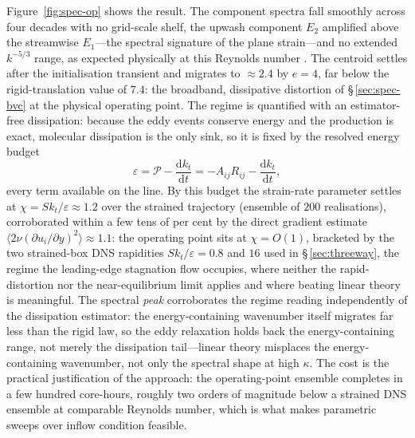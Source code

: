 \documentclass[11pt,a4paper]{article}
\begin{document}
Figure~\ref{fig:spec-op} shows the result. The component spectra fall
smoothly across four decades with no grid-scale shelf, the upwash
component $E_2$ amplified above the streamwise $E_1$---the spectral
signature of the plane strain---and no extended $k^{-5/3}$ range, as
expected physically at this Reynolds number
\citep{Kolmogorov1991,Pope2000}. The centroid settles after the
initialisation transient and migrates to $\approx2.4$ by $e=4$, far
below the rigid-translation value of $7.4$: the broadband, dissipative
distortion of \S\,\ref{sec:spec-bvc} at the physical operating point. The regime is
quantified with an estimator-free dissipation: because the eddy events
conserve energy and the production is exact, molecular dissipation is
the only sink, so it is fixed by the resolved energy budget
\begin{equation}
  \varepsilon = \mathcal{P} - \frac{\mathrm{d}k_t}{\mathrm{d}t}
              = -A_{ij}R_{ij} - \frac{\mathrm{d}k_t}{\mathrm{d}t},
  \label{eq:eps-budget}
\end{equation}
every term available on the line. By this budget the strain-rate
parameter settles at $\chi=Sk_t/\varepsilon\approx1.2$ over the strained
trajectory (ensemble of $200$ realisations), corroborated within a few
tens of per cent by the direct gradient estimate
$\langle2\nu(\partial u_i/\partial y)^2\rangle\approx1.1$: the
operating point sits at $\chi=O(1)$, bracketed by the two strained-box
DNS rapidities $Sk_t/\varepsilon=0.8$ and $16$ used in
\S\,\ref{sec:threeway}, the regime the leading-edge
stagnation flow occupies, where neither the rapid-distortion nor the
near-equilibrium limit applies and where beating linear theory is
meaningful. The spectral \emph{peak} corroborates the regime reading
independently of the dissipation estimator: the energy-containing
wavenumber itself migrates far less than the rigid law, so the eddy
relaxation holds back the energy-containing range, not merely the
dissipation tail---linear theory misplaces the energy-containing
wavenumber, not only the spectral shape at high $\kappa$. The cost is
the practical justification of the approach: the operating-point
ensemble completes in a few hundred core-hours, roughly two orders of
magnitude below a strained DNS ensemble at comparable Reynolds number,
which is what makes parametric sweeps over inflow condition feasible.
\end{document}
